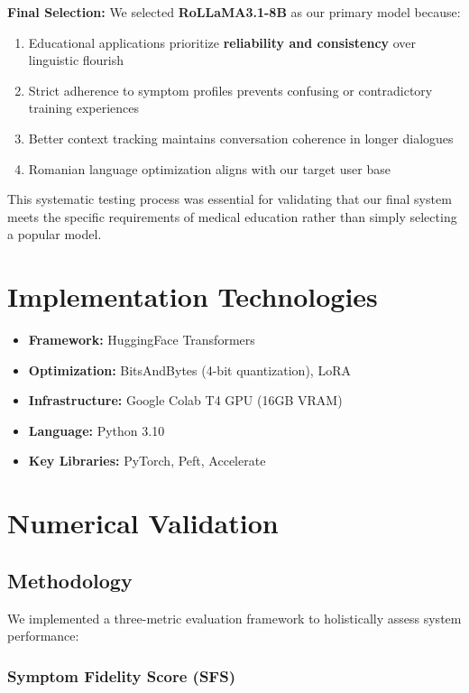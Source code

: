 \documentclass[runningheads,a4paper,11pt]{report}
\begin{document}
\textbf{Final Selection:} We selected \textbf{RoLLaMA3.1-8B} as our primary model because:
\begin{enumerate}
\item Educational applications prioritize \textbf{reliability and consistency} over linguistic flourish
\item Strict adherence to symptom profiles prevents confusing or contradictory training experiences
\item Better context tracking maintains conversation coherence in longer dialogues
\item Romanian language optimization aligns with our target user base
\end{enumerate}

This systematic testing process was essential for validating that our final system meets the specific requirements of medical education rather than simply selecting a popular model.

\section{Implementation Technologies}

\begin{itemize}
\item \textbf{Framework:} HuggingFace Transformers
\item \textbf{Optimization:} BitsAndBytes (4-bit quantization), LoRA
\item \textbf{Infrastructure:} Google Colab T4 GPU (16GB VRAM)
\item \textbf{Language:} Python 3.10
\item \textbf{Key Libraries:} PyTorch, Peft, Accelerate
\end{itemize}

\section{Numerical Validation}
\label{section:numericalValidation}

\subsection{Methodology}

We implemented a three-metric evaluation framework to holistically assess system performance:

\subsubsection{Symptom Fidelity Score (SFS)}
\end{document}
